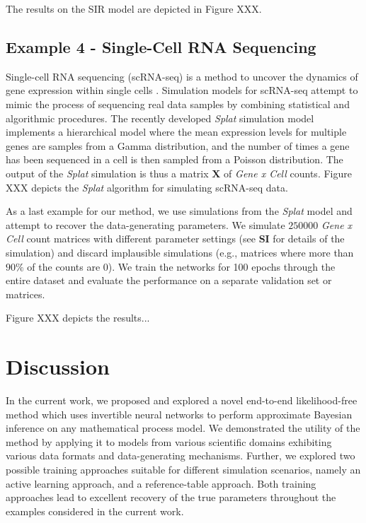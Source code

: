 \documentclass[9pt,twoside,lineno]{pnas-new}
\begin{document}
The results on the SIR model are depicted in Figure XXX. 

\subsection*{Example 4 - Single-Cell RNA Sequencing}
Single-cell RNA sequencing (scRNA-seq) is a method to uncover the dynamics of gene expression within single cells \cite{zappia2017splatter, ozsolak2011rna}. Simulation models for scRNA-seq attempt to mimic the process of sequencing real data samples by combining statistical and algorithmic procedures. The recently developed \textit{Splat} simulation model \cite{zappia2017splatter} implements a hierarchical model where the mean expression levels for multiple genes are samples from a Gamma distribution, and the number of times a gene has been sequenced in a cell is then sampled from a Poisson distribution. The output of the \textit{Splat} simulation is thus a matrix $\boldsymbol{X}$ of \textit{Gene x Cell} counts. Figure XXX depicts the \textit{Splat} algorithm for simulating scRNA-seq data.


As a last example for our method, we use simulations from the \textit{Splat} model and attempt to recover the data-generating parameters. We simulate $250000$  \textit{Gene x Cell} count matrices with different parameter settings (see \textbf{SI} for details of the simulation) and discard implausible simulations (e.g., matrices where more than $90\%$ of the counts are $0$). We train the networks for 100 epochs through the entire dataset and evaluate the performance on a separate validation set or matrices.

Figure XXX depicts the results...

\section*{Discussion}

In the current work, we proposed and explored a novel end-to-end likelihood-free method which uses invertible neural networks to perform approximate Bayesian inference on any mathematical process model. We demonstrated the utility of the method by applying it to models from various scientific domains exhibiting various data formats and data-generating mechanisms. Further, we explored two possible training approaches suitable for different simulation scenarios, namely an active learning approach, and a reference-table approach. Both training approaches lead to excellent recovery of the true parameters throughout the examples considered in the current work.
\end{document}
